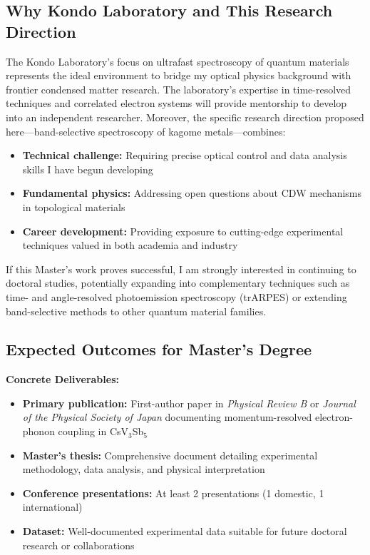 \documentclass[12pt,a4paper]{article}
\begin{document}
\subsection{Why Kondo Laboratory and This Research Direction}

The Kondo Laboratory's focus on ultrafast spectroscopy of quantum materials represents the ideal environment to bridge my optical physics background with frontier condensed matter research. The laboratory's expertise in time-resolved techniques and correlated electron systems will provide mentorship to develop into an independent researcher. Moreover, the specific research direction proposed here—band-selective spectroscopy of kagome metals—combines:

\begin{itemize}
    \item \textbf{Technical challenge:} Requiring precise optical control and data analysis skills I have begun developing
    \item \textbf{Fundamental physics:} Addressing open questions about CDW mechanisms in topological materials
    \item \textbf{Career development:} Providing exposure to cutting-edge experimental techniques valued in both academia and industry
\end{itemize}

If this Master's work proves successful, I am strongly interested in continuing to doctoral studies, potentially expanding into complementary techniques such as time- and angle-resolved photoemission spectroscopy (trARPES) or extending band-selective methods to other quantum material families.

\subsection{Expected Outcomes for Master's Degree}

\textbf{Concrete Deliverables:}
\begin{itemize}
    \item \textbf{Primary publication:} First-author paper in \textit{Physical Review B} or \textit{Journal of the Physical Society of Japan} documenting momentum-resolved electron-phonon coupling in CsV$_3$Sb$_5$
    \item \textbf{Master's thesis:} Comprehensive document detailing experimental methodology, data analysis, and physical interpretation
    \item \textbf{Conference presentations:} At least 2 presentations (1 domestic, 1 international)
    \item \textbf{Dataset:} Well-documented experimental data suitable for future doctoral research or collaborations
\end{itemize}
\end{document}
